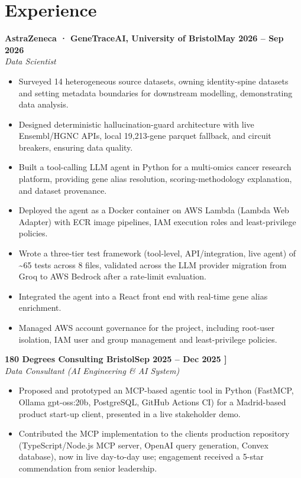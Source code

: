\documentclass[a4paper,11pt]{article}
\newcommand{\entry}[4]{\needspace{4\baselineskip}\noindent\textbf{#1}\hfill\textbf{#2}\\ \textit{#3}\hfill\textit{#4}\par}
\begin{document}
\section{Experience}
\entry{AstraZeneca · GeneTraceAI, University of Bristol}{May 2026 – Sep 2026}{Data Scientist}{}
\begin{itemize}
  \item Surveyed 14 heterogeneous source datasets, owning identity-spine datasets and setting metadata boundaries for downstream modelling, demonstrating data analysis.
  \item Designed deterministic hallucination-guard architecture with live Ensembl/HGNC APIs, local 19,213-gene parquet fallback, and circuit breakers, ensuring data quality.
  \item Built a tool-calling LLM agent in Python for a multi-omics cancer research platform, providing gene alias resolution, scoring-methodology explanation, and dataset provenance.
  \item Deployed the agent as a Docker container on AWS Lambda (Lambda Web Adapter) with ECR image pipelines, IAM execution roles and least-privilege policies.
  \item Wrote a three-tier test framework (tool-level, API/integration, live agent) of \textasciitilde{}65 tests across 8 files, validated across the LLM provider migration from Groq to AWS Bedrock after a rate-limit evaluation.
  \item Integrated the agent into a React front end with real-time gene alias enrichment.
  \item Managed AWS account governance for the project, including root-user isolation, IAM user and group management and least-privilege policies.
\end{itemize}
\vspace{4pt}
\entry{180 Degrees Consulting Bristol}{Sep 2025 – Dec 2025   ]}{Data Consultant (AI Engineering \& AI System)}{}
\begin{itemize}
  \item Proposed and prototyped an MCP-based agentic tool in Python (FastMCP, Ollama gpt-oss:20b, PostgreSQL, GitHub Actions CI) for a Madrid-based product start-up client, presented in a live stakeholder demo.
  \item Contributed the MCP implementation to the client\textquotesingle{}s production repository (TypeScript/Node.js MCP server, OpenAI query generation, Convex database), now in live day-to-day use; engagement received a 5-star commendation from senior leadership.
\end{itemize}
\end{document}

